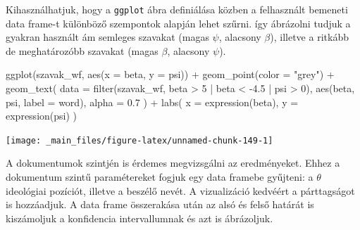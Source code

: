 \documentclass[
]{book}
\newenvironment{Shaded}{\begin{snugshade}}{\end{snugshade}}
\newcommand{\AttributeTok}[1]{\textcolor[rgb]{0.77,0.63,0.00}{#1}}
\newcommand{\DecValTok}[1]{\textcolor[rgb]{0.00,0.00,0.81}{#1}}
\newcommand{\FloatTok}[1]{\textcolor[rgb]{0.00,0.00,0.81}{#1}}
\newcommand{\FunctionTok}[1]{\textcolor[rgb]{0.00,0.00,0.00}{#1}}
\newcommand{\NormalTok}[1]{#1}
\newcommand{\SpecialCharTok}[1]{\textcolor[rgb]{0.00,0.00,0.00}{#1}}
\newcommand{\StringTok}[1]{\textcolor[rgb]{0.31,0.60,0.02}{#1}}
\begin{document}
Kihasználhatjuk, hogy a \texttt{ggplot} ábra definiálása közben a
felhasznált bemeneti data frame-t különböző szempontok alapján lehet
szűrni. így ábrázolni tudjuk a gyakran használt ám semleges szavakat
(magas \(\psi\), alacsony \(\beta\)), illetve a ritkább de meghatározóbb
szavakat (magas \(\beta\), alacsony \(\psi\)).

\begin{Shaded}
\begin{Highlighting}[]
\FunctionTok{ggplot}\NormalTok{(szavak\_wf, }\FunctionTok{aes}\NormalTok{(}\AttributeTok{x =}\NormalTok{ beta, }\AttributeTok{y =}\NormalTok{ psi)) }\SpecialCharTok{+}
  \FunctionTok{geom\_point}\NormalTok{(}\AttributeTok{color =} \StringTok{"grey"}\NormalTok{) }\SpecialCharTok{+}
  \FunctionTok{geom\_text}\NormalTok{(}
    \AttributeTok{data =} \FunctionTok{filter}\NormalTok{(szavak\_wf, beta }\SpecialCharTok{\textgreater{}} \DecValTok{5} \SpecialCharTok{|}\NormalTok{ beta }\SpecialCharTok{\textless{}} \SpecialCharTok{{-}}\FloatTok{4.5} \SpecialCharTok{|}\NormalTok{ psi }\SpecialCharTok{\textgreater{}} \DecValTok{0}\NormalTok{),}
    \FunctionTok{aes}\NormalTok{(beta, psi, }\AttributeTok{label =}\NormalTok{ word),}
    \AttributeTok{alpha =} \FloatTok{0.7}
\NormalTok{    ) }\SpecialCharTok{+}
  \FunctionTok{labs}\NormalTok{(}
    \AttributeTok{x =} \FunctionTok{expression}\NormalTok{(beta),}
    \AttributeTok{y =} \FunctionTok{expression}\NormalTok{(psi)}
\NormalTok{    )}
\end{Highlighting}
\end{Shaded}

\begin{center}\texttt{[image: \_main\_files/figure-latex/unnamed-chunk-149-1]} \end{center}

A dokumentumok szintjén is érdemes megvizsgálni az eredményeket. Ehhez a
dokumentum szintű paramétereket fogjuk egy data framebe gyűjteni: a
\(\theta\) ideológiai pozíciót, illetve a beszélő nevét. A vizualizáció
kedvéért a párttagságot is hozzáadjuk. A data frame összerakása után az
alsó és felső határát is kiszámoljuk a konfidencia intervallumnak és azt
is ábrázoljuk.
\end{document}
